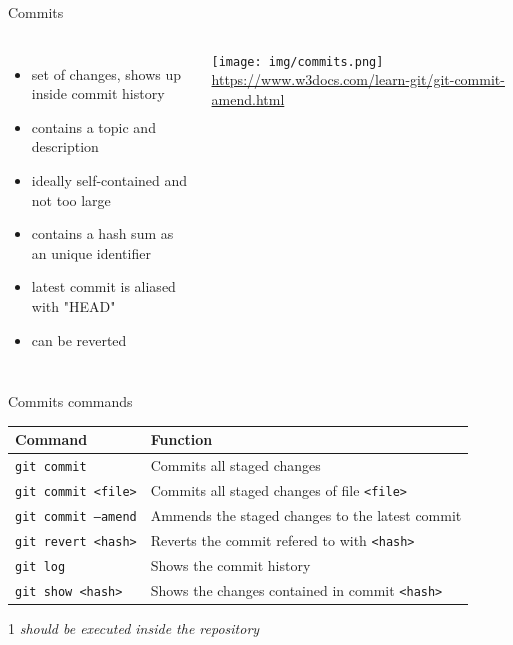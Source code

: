 \documentclass[10pt, graphics, aspectratio=169, table]{beamer}
\begin{document}
    \begin{frame}{Commits}
        \begin{columns}
                \begin{itemize}
                    \item set of changes, shows up inside commit history
                    \item contains a topic and description
                    \item ideally self-contained and not too large
                    \item contains a hash sum as an unique identifier
                    \item latest commit is aliased with "HEAD"
                    \item can be reverted
                \end{itemize}
                \center\texttt{[image: img/commits.png]}
                \center\tiny\url{https://www.w3docs.com/learn-git/git-commit-amend.html}
        \end{columns}
    \end{frame}

    \begin{frame}{Commits commands}
        \begin{table}
            \centering
            \begin{threeparttable}
                \begin{tabular}{ll}
                    \toprule
                    Command & Function \\
                    \midrule
                    \texttt{git commit} & Commits all staged changes\tnote{1} \\
                    \texttt{git commit <file>} & Commits all staged changes of file \texttt{<file>}\tnote{1} \\
                    \texttt{git commit --amend} & Ammends the staged changes to the latest commit\tnote{1} \\
                    \texttt{git revert <hash>} & Reverts the commit refered to with \texttt{<hash>}\tnote{1} \\
                    \texttt{git log} & Shows the commit history\tnote{1} \\
                    \texttt{git show <hash>} & Shows the changes contained in commit \texttt{<hash>}\tnote{1} \\
                    \bottomrule
                \end{tabular}
                \begin{tablenotes}
                    \item [1]\emph{should be executed inside the repository}
                \end{tablenotes}
            \end{threeparttable}
        \end{table}
    \end{frame}
\end{document}
